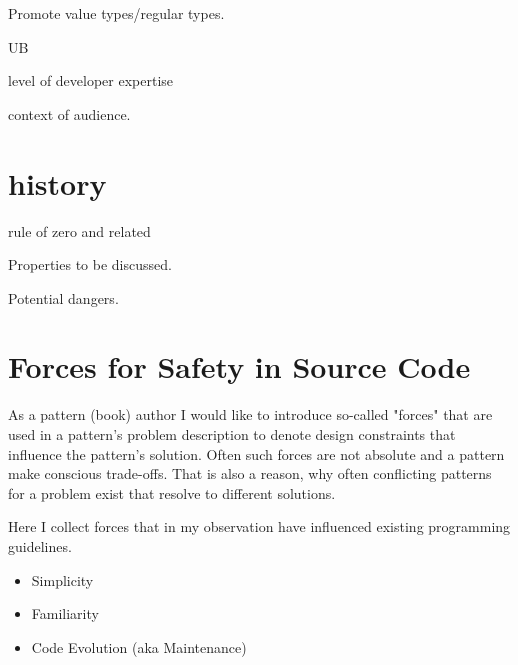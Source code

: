 \documentclass[ebook,11pt,article]{memoir}
\begin{document}

Promote value types/regular types.

UB


level of developer expertise

context of audience.

\chapter{history}

rule of zero and related



Properties to be discussed. 

Potential dangers.

\chapter{Forces for Safety in Source Code}
As a pattern (book) author I would like to introduce so-called "forces" that are used in a pattern's problem description to denote design constraints that influence the pattern's solution. Often such forces are not absolute and a pattern make conscious trade-offs. That is also a reason, why often conflicting patterns for a problem exist that resolve to different solutions.

Here I collect forces that in my observation have influenced existing programming guidelines.
\begin{itemize}
\item Simplicity
\item Familiarity
\item Code Evolution (aka Maintenance)
\end{itemize}
\end{document}

